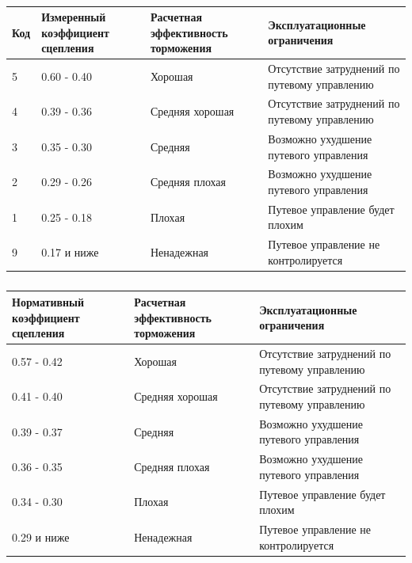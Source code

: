 \begin{table}[]
    \begin{center}
    \caption{} \label{tbl:04T2}
    \small
    \begin{tabular}{|p{}|p{}|p{}|p{}|}
    \hline
    Код	&Измеренный коэффициент сцепления	&Расчетная эффективность торможения	&Эксплуатационные ограничения\\
    \hline
    5	&0.60 - 0.40	                    &Хорошая	                        &Отсутствие затруднений по путевому управлению\\
    4	&0.39 - 0.36	                    &Средняя хорошая	                &Отсутствие затруднений по путевому управлению\\
    3	&0.35 - 0.30	                    &Средняя	                        &Возможно ухудшение путевого управления\\
    2	&0.29 - 0.26	                    &Средняя плохая	                    &Возможно ухудшение путевого управления\\
    1	&0.25 - 0.18	                    &Плохая	                            &Путевое управление будет плохим\\
    9	&0.17 и ниже	                    &Ненадежная	                        &Путевое управление не контролируется\\
    \hline\hline
    \end{tabular}
    \end{center}
\end{table}

\begin{table}[]
    \begin{center}
    \caption{} \label{tbl:04T3}
    \small
    \begin{tabular}{|p{}|p{}|p{}|}
    \hline
    Нормативный коэффициент сцепления	&Расчетная эффективность торможения	&Эксплуатационные ограничения\\
    \hline    
    0.57 - 0.42	                        &Хорошая	                        &Отсутствие затруднений по путевому управлению\\
    0.41 - 0.40	                        &Средняя хорошая	                &Отсутствие затруднений по путевому управлению\\
    0.39 - 0.37	                        &Средняя	                        &Возможно ухудшение путевого управления\\
    0.36 - 0.35	                        &Средняя плохая	                    &Возможно ухудшение путевого управления\\
    0.34 - 0.30	                        &Плохая	                            &Путевое управление будет плохим\\
    0.29 и ниже	                        &Ненадежная	                        &Путевое управление не контролируется\\        \hline\hline
    \end{tabular}
    \end{center}
\end{table}


